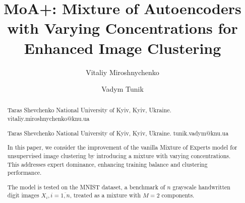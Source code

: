 \documentclass[ascii]{abook}
\begin{document}


\begin{abstract}



\title{MoA+: Mixture of Autoencoders with Varying Concentrations for Enhanced Image Clustering}




\author[V. ~Miroshnychenko]{Vitaliy Miroshnychenko}
{Taras Shevchenko National University of Kyiv, Kyiv, Ukraine.}
{vitaliy.miroshnychenko@knu.ua}
\author[V.~Tunik]{Vadym Tunik}
{Taras Shevchenko National University of Kyiv, Kyiv, Ukraine.}
{tunik.vadym@knu.ua}

\maketitle


In this paper, we consider the improvement of the vanilla Mixture of Experts model \cite{hinton1991} for unsupervised image clustering by introducing a mixture with varying concentrations. This addresses expert dominance, enhancing training balance and clustering performance. 

The model is tested on the MNIST dataset, a benchmark of $n$ grayscale handwritten digit images $X_i, i=\overline{1,n}$, treated as a mixture with $M = 2$ components. 


\end{abstract}
\end{document}
